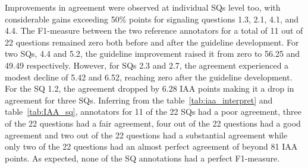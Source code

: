 \documentclass[sn-mathphys,Numbered]{sn-jnl}%
\theoremstyle{thmstyleone}%
\theoremstyle{thmstyletwo}%
\theoremstyle{thmstylethree}%
\begin{document}
Improvements in agreement were observed at individual SQs level too, with considerable gains exceeding 50\% points for signaling questions 1.3, 2.1, 4.1, and 4.4.
The F1-measure between the two reference annotators for a total of 11 out of 22 questions remained zero both before and after the guideline development.
For two SQs, 4.4 and 5.2, the guideline improvement raised it from zero to 56.25 and 49.49 respectively.
However, for SQs 2.3 and 2.7, the agreement experienced a modest decline of 5.42 and 6.52, reaching zero after the guideline development.
For the SQ 1.2, the agreement dropped by 6.28 IAA points making it a drop in agreement for three SQs.
Inferring from the table~\ref{tab:iaa_interpret} and table~\ref{tab:IAA_sq}, annotators for 11 of the 22 SQs had a poor agreement, three of the 22 questions had a fair agreement, four out of the 22 questions had a good agreement and two out of the 22 questions had a substantial agreement while only two of the 22 questions had an almost perfect agreement of beyond 81 IAA points.
As expected, none of the SQ annotations had a perfect F1-measure.
%
%
%
\end{document}
